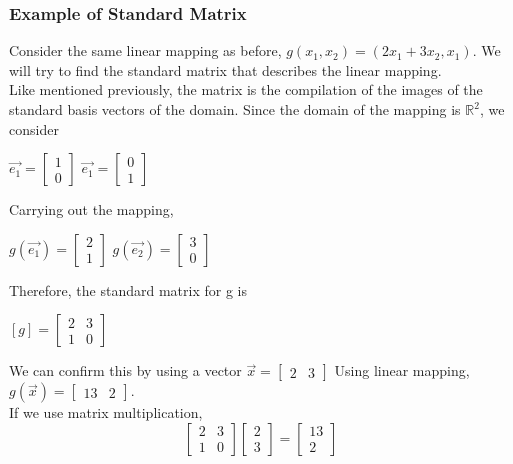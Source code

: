 \documentclass[12pt]{article}
\newcommand{\R}{\mathbb{R}}
\begin{document}
\subsubsection{Example of Standard Matrix}
Consider the same linear mapping as before, $g(x_1,x_2) = (2x_1+3x_2 , x_1)$. We will try to find the standard matrix that describes the linear mapping.\\
Like mentioned previously, the matrix is the compilation of the images of the standard basis vectors of the domain. Since the domain of the mapping is $\R^2$, we consider\\
\begin{center}
$\vec{e_1} = \begin{bmatrix}1\\0\end{bmatrix}$
$\vec{e_1} = \begin{bmatrix}0\\1\end{bmatrix}$
\end{center}
Carrying out the mapping,
\begin{center}
$g(\vec{e_1}) = \begin{bmatrix}2\\1\end{bmatrix}$
$g(\vec{e_2}) = \begin{bmatrix}3\\0\end{bmatrix}$
\end{center}
Therefore, the standard matrix for g is 

\begin{center}
$[g] = \begin{bmatrix}2 & 3\\1 & 0\end{bmatrix}$
\end{center}
We can confirm this by using a vector $\vec{x} = \begin{bmatrix}2 & 3\end{bmatrix} $
Using linear mapping, $g(\vec{x}) = \begin{bmatrix}13 & 2\end{bmatrix}$.\\
If we use matrix multiplication,
\begin{equation}
\begin{bmatrix}2 & 3\\1 & 0\end{bmatrix}\begin{bmatrix}2 \\ 3\end{bmatrix}=  \begin{bmatrix}13 \\ 2\end{bmatrix}
\end{equation}
\end{document}
